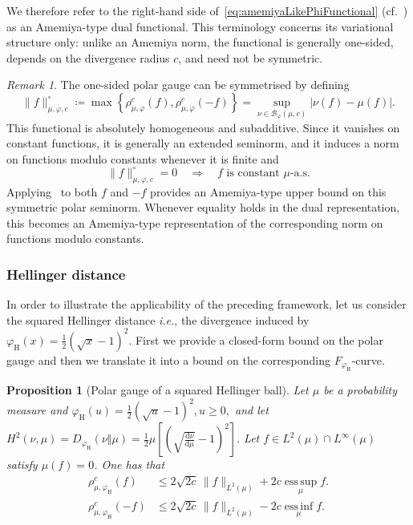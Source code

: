 \documentclass[11pt]{article}
\newcommand{\B}{\mathcal{B}}
\theoremstyle{plain}
\newtheorem{proposition}{Proposition}
\theoremstyle{remark}
\newtheorem{remark}{Remark}
\begin{document}
   We therefore refer to the right-hand side of~\eqref{eq:amemiyaLikePhiFunctional} (cf.~) as an Amemiya-type dual functional. This terminology concerns its variational structure only: unlike an Amemiya norm, the functional is generally one-sided, depends on the divergence radius \(c\), and need not be symmetric.
   \begin{remark}
       The one-sided polar gauge can be symmetrised by defining
\begin{equation}
\|f\|_{\mu,\varphi,c}^{\circ}
\coloneqq
\max\left\{
\rho_{\mu,\varphi}^{c}(f),
\rho_{\mu,\varphi}^{c}(-f)
\right\}
=
\sup_{\nu\in\B_\varphi(\mu,c)}
\left|\nu(f)-\mu(f)\right|.
\end{equation}
This functional is absolutely homogeneous and subadditive. Since it
vanishes on constant functions, it is generally an extended seminorm,
and it induces a norm on functions modulo constants whenever it is
finite and
\[
\|f\|_{\mu,\varphi,c}^{\circ}=0
\quad\Longrightarrow\quad
f \text{ is constant } \mu\text{-a.s.}
\]
Applying~ to both $f$ and $-f$
provides an Amemiya-type upper bound on this symmetric polar
seminorm. Whenever equality holds in the dual representation, this
becomes an Amemiya-type representation of the corresponding norm on
functions modulo constants.
   \end{remark}
   
\subsubsection{Hellinger distance}
In order to illustrate the applicability of the preceding framework, let us consider the squared Hellinger distance \textit{i.e.}, the divergence induced by $\varphi_{\mathrm H}(x)=\frac{1}{2}(\sqrt{x}-1)^2$. First we provide a closed-form bound on the polar gauge and then we translate it into a bound on the corresponding $F_{\varphi_{\mathrm H}}$-curve.
   \begin{proposition}[Polar gauge of a squared Hellinger ball]\label{prop:hellingerPolarGauge}
    Let $\mu$ be a probability measure and
    \(
        \varphi_{\mathrm H}(u)=\frac{1}{2}(\sqrt{u}-1)^2,
        u\geq 0,
    \)
    and let
    \( 
        H^2(\nu,\mu)
        =
        D_{\varphi_{\mathrm H}}(\nu\Vert\mu)
        =
        \frac{1}{2}
        \mu\left[
        \left(
        \sqrt{\frac{\mathrm d\nu}{\mathrm d\mu}}-1
        \right)^2
        \right].
    \) Let $f\in L^2(\mu)\cap L^\infty(\mu)$ satisfy $\mu(f)=0$.
    One has that
    \begin{align} \rho_{\mu,\varphi_{\mathrm H}}^c(f)
        &\leq
        2\sqrt{2c}\,
        \lVert f\rVert_{L^2(\mu)}
        +
        2c\operatorname*{ess\,sup}_{\mu}f.
        \label{eq:hellingerPolarExplicit}\\
  \rho_{\mu,\varphi_{\mathrm H}}^c(-f)
        &\leq
        2\sqrt{2c}\,
        \lVert f\rVert_{L^2(\mu)}
        -
        2c\operatorname*{ess\,inf}_{\mu}f.
        \label{eq:hellingerPolarExplicitNegative}
    \end{align}
\end{proposition}
\end{document}
